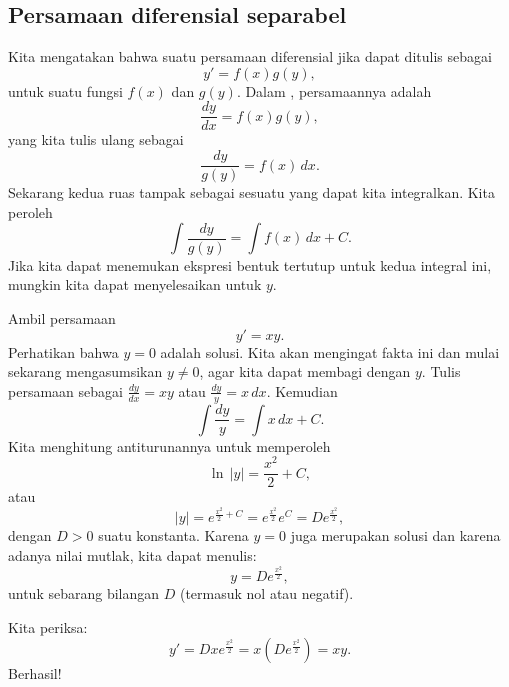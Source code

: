 \subsection{Persamaan diferensial separabel}

Kita mengatakan bahwa suatu persamaan diferensial
\emph{}
jika dapat ditulis sebagai
\begin{equation*}
y' = f(x)g(y) ,
\end{equation*}
untuk suatu fungsi $f(x)$ dan $g(y)$.
Dalam , persamaannya adalah
\begin{equation*}
\frac{dy}{dx} = f(x)g(y) ,
\end{equation*}
yang kita tulis ulang sebagai
\begin{equation*}
\frac{dy}{g(y)} = f(x) \,dx .
\end{equation*}
Sekarang kedua ruas tampak sebagai sesuatu yang dapat kita integralkan.  Kita peroleh
\begin{equation*}
\int \frac{dy}{g(y)} = \int f(x) \,dx + C .
\end{equation*}
Jika kita dapat menemukan ekspresi bentuk tertutup
untuk kedua integral ini, mungkin kita dapat menyelesaikan untuk $y$.

\begin{example} \label{example:yprimeisxy}
Ambil persamaan
\begin{equation*}
y' = xy .
\end{equation*}
Perhatikan bahwa $y=0$ adalah solusi.  Kita akan mengingat fakta ini dan
mulai sekarang mengasumsikan $y \neq 0$, agar kita dapat membagi dengan $y$.
Tulis persamaan sebagai $\frac{dy}{dx} = xy$ atau
$\frac{dy}{y} = x \, dx$.
Kemudian
\begin{equation*}
\int \frac{dy}{y} = \int x\,dx + C .
\end{equation*}
Kita menghitung antiturunannya untuk memperoleh
\begin{equation*}
\ln \, \lvert y\rvert = \frac{x^2}{2} + C ,
\end{equation*}
atau
\begin{equation*}
\lvert y \rvert = e^{\frac{x^2}{2} + C} = e^{\frac{x^2}{2}} e^C = D e^{\frac{x^2}{2}} ,
\end{equation*}
dengan $D > 0$ suatu konstanta.  Karena $y=0$ juga merupakan solusi dan karena
adanya nilai mutlak, kita dapat menulis:
\begin{equation*}
y = D e^{\frac{x^2}{2}} ,
\end{equation*}
untuk sebarang bilangan $D$ (termasuk nol atau negatif).

Kita periksa:
\begin{equation*}
y' = D x e^{\frac{x^2}{2}} = x \left( D e^{\frac{x^2}{2}} \right) = xy .
\end{equation*}
Berhasil!
\end{example}

